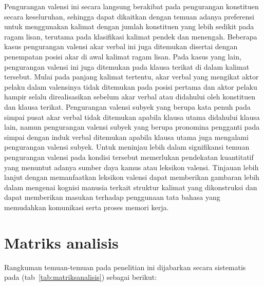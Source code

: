 Pengurangan valensi ini secara langsung berakibat pada pengurangan konstituen secara keseluruhan, sehingga dapat dikaitkan dengan temuan adanya preferensi untuk menggunakan kalimat dengan jumlah konstituen yang lebih sedikit pada ragam lisan, terutama pada klasifikasi kalimat pendek dan menengah. Beberapa kasus pengurangan valensi akar verbal ini juga ditemukan disertai dengan penempatan posisi akar di awal kalimat ragam lisan. Pada kasus yang lain, pengurangan valensi ini juga ditemukan pada klausa terikat di dalam kalimat tersebut. Mulai pada panjang kalimat tertentu, akar verbal yang mengikat aktor pelaku dalam valensinya tidak ditemukan pada posisi pertama dan aktor pelaku hampir selalu direalisasikan sebelum akar verbal atau didahului oleh konstituen dan klausa terikat. Pengurangan valensi subyek yang berupa kata penuh pada simpai pusat akar verbal tidak ditemukan apabila klausa utama didahului klausa lain, namun pengurangan valensi subyek yang berupa pronomina pengganti pada simpai dengan induk verbal ditemukan apabila klausa utama juga mengalami pengurangan valensi subyek. Untuk meninjau lebih dalam signifikansi temuan pengurangan valensi pada kondisi tersebut memerlukan pendekatan kuantitatif yang menuntut adanya sumber daya kamus atau leksikon valensi. Tinjauan lebih lanjut dengan memanfaatkan leksikon valensi dapat memberikan gambaran lebih dalam mengenai kognisi manusia terkait struktur kalimat yang dikonstruksi dan dapat memberikan masukan terhadap penggunaan tata bahasa yang memudahkan komunikasi serta proses memori kerja.

\section{Matriks analisis}
Rangkuman temuan-temuan pada penelitian ini dijabarkan secara sistematis pada (tab~\ref{tab:matriksanalisis}) sebagai berikut:

